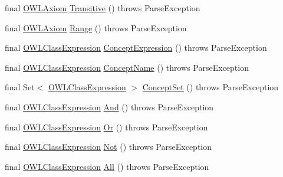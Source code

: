\begin{DoxyCompactItemize}
\item 
final \hyperlink{interfaceorg_1_1semanticweb_1_1owlapi_1_1model_1_1_o_w_l_axiom}{O\-W\-L\-Axiom} \hyperlink{classorg_1_1coode_1_1owl_1_1krssparser_1_1_k_r_s_s_parser_abc13ec5ebbd5d03b7d851f705ee6b791}{Transitive} ()  throws Parse\-Exception 
\item 
final \hyperlink{interfaceorg_1_1semanticweb_1_1owlapi_1_1model_1_1_o_w_l_axiom}{O\-W\-L\-Axiom} \hyperlink{classorg_1_1coode_1_1owl_1_1krssparser_1_1_k_r_s_s_parser_aafd6810323cd9a5f24229fcbf60c7d14}{Range} ()  throws Parse\-Exception 
\item 
final \hyperlink{interfaceorg_1_1semanticweb_1_1owlapi_1_1model_1_1_o_w_l_class_expression}{O\-W\-L\-Class\-Expression} \hyperlink{classorg_1_1coode_1_1owl_1_1krssparser_1_1_k_r_s_s_parser_aa23534bd1dacacbf7d612970b662d740}{Concept\-Expression} ()  throws Parse\-Exception 
\item 
final \hyperlink{interfaceorg_1_1semanticweb_1_1owlapi_1_1model_1_1_o_w_l_class_expression}{O\-W\-L\-Class\-Expression} \hyperlink{classorg_1_1coode_1_1owl_1_1krssparser_1_1_k_r_s_s_parser_a8604616088cae980a153c52a09d4ed36}{Concept\-Name} ()  throws Parse\-Exception 
\item 
final Set$<$ \hyperlink{interfaceorg_1_1semanticweb_1_1owlapi_1_1model_1_1_o_w_l_class_expression}{O\-W\-L\-Class\-Expression} $>$ \hyperlink{classorg_1_1coode_1_1owl_1_1krssparser_1_1_k_r_s_s_parser_aa5801afb7435b269ed67375d8128d948}{Concept\-Set} ()  throws Parse\-Exception 
\item 
final \hyperlink{interfaceorg_1_1semanticweb_1_1owlapi_1_1model_1_1_o_w_l_class_expression}{O\-W\-L\-Class\-Expression} \hyperlink{classorg_1_1coode_1_1owl_1_1krssparser_1_1_k_r_s_s_parser_af9bff99f4d1337f4ab159169c86239fb}{And} ()  throws Parse\-Exception 
\item 
final \hyperlink{interfaceorg_1_1semanticweb_1_1owlapi_1_1model_1_1_o_w_l_class_expression}{O\-W\-L\-Class\-Expression} \hyperlink{classorg_1_1coode_1_1owl_1_1krssparser_1_1_k_r_s_s_parser_abd9e04f7f7412b03ee48c695edc51a79}{Or} ()  throws Parse\-Exception 
\item 
final \hyperlink{interfaceorg_1_1semanticweb_1_1owlapi_1_1model_1_1_o_w_l_class_expression}{O\-W\-L\-Class\-Expression} \hyperlink{classorg_1_1coode_1_1owl_1_1krssparser_1_1_k_r_s_s_parser_a21f5d343c875a2adae44b978199976f9}{Not} ()  throws Parse\-Exception 
\item 
final \hyperlink{interfaceorg_1_1semanticweb_1_1owlapi_1_1model_1_1_o_w_l_class_expression}{O\-W\-L\-Class\-Expression} \hyperlink{classorg_1_1coode_1_1owl_1_1krssparser_1_1_k_r_s_s_parser_a083339ba7c7abf0f9e6070e11e113d9b}{All} ()  throws Parse\-Exception 

\end{DoxyCompactItemize}

